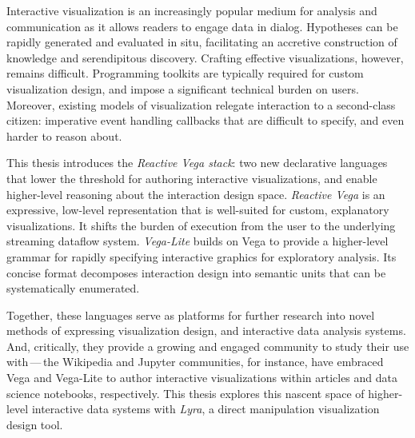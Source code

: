 
\vspace{-30pt}

Interactive visualization is an increasingly popular medium for analysis and
communication as it allows readers to engage data in dialog. Hypotheses can be
rapidly generated and evaluated in situ, facilitating an accretive construction
of knowledge and serendipitous discovery. Crafting effective visualizations,
however, remains difficult. Programming toolkits are typically required for
custom visualization design, and impose a significant technical burden on users.
Moreover, existing models of visualization relegate interaction to a
second-class citizen: imperative event handling callbacks that are difficult to
specify, and even harder to reason about.

This thesis introduces the \emph{Reactive Vega stack}: two new declarative
languages that lower the threshold for authoring interactive visualizations, and
enable higher-level reasoning about the interaction design space. \emph{Reactive
Vega} is an expressive, low-level representation that is well-suited for custom,
explanatory visualizations. It shifts the burden of execution from the user to
the underlying streaming dataflow system. \emph{Vega-Lite} builds on Vega to
provide a higher-level grammar for rapidly specifying interactive graphics for
exploratory analysis. Its concise format decomposes interaction design into
semantic units that can be systematically enumerated.

Together, these languages serve as platforms for further research into novel
methods of expressing visualization design, and interactive data analysis
systems. And, critically, they provide a growing and engaged community to study
their use with\,---\,the Wikipedia and Jupyter communities, for instance, have
embraced Vega and Vega-Lite to author interactive visualizations within articles
and data science notebooks, respectively. This thesis explores this nascent
space of higher-level interactive data systems with \emph{Lyra}, a direct
manipulation visualization design tool.